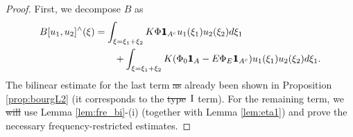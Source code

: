 \documentclass[a4paper,
11pt,  reqno]{amsart}
\newcommand{\mathbbm}[1]{\mathchoice%
    {\hbox{\sffamily 1\kern-.40em 1}}%
    {\hbox{\sffamily 1\kern-.40em 1}}%
    {\hbox{\scriptsize\sffamily 1\kern-.30em 1}}%
    {\hbox{\tiny\sffamily 1\kern-.25em 1}}}%
\newcommand{\I}{\hspace{0.2mm}\textup{I}\hspace{0.2mm}}
\newcommand{\5}{\textup{V}}
\theoremstyle{remark}
\numberwithin{equation}{section}
\numberwithin{theorem}{section}
\providecommand{\DIFaddtex}[1]{{\protect\color{blue}\uwave{#1}}} %
\providecommand{\DIFdeltex}[1]{{\protect\color{red}\sout{#1}}}                      %
\providecommand{\DIFaddbegin}{} %
\providecommand{\DIFaddend}{} %
\providecommand{\DIFdelbegin}{} %
\providecommand{\DIFdelend}{} %
\providecommand{\DIFadd}[1]{\texorpdfstring{\DIFaddtex{#1}}{#1}} %
\providecommand{\DIFdel}[1]{\texorpdfstring{\DIFdeltex{#1}}{}} %
\begin{document}
\begin{proof}
First, we decompose $B$ as
\DIFdelbegin %
\DIFdelend \DIFaddbegin \begin{align*}
B[u_1,u_2]^\wedge(\xi)&=\int_{\xi=\xi_1+\xi_2} K\Phi\mathbbm{1}_{A^c}u_1(\xi_1)u_2(\xi_2)d\xi_1 \\&\qquad+ \int_{\xi=\xi_1+\xi_2} K(\Phi_0\mathbbm{1}_A -E\Phi_E\mathbbm{1}_{A^c})u_1(\xi_1)u_2(\xi_2)d\xi_1.
\end{align*}\DIFaddend 
The bilinear estimate for the last term \DIFdelbegin \DIFdel{as }\DIFdelend \DIFaddbegin \DIFadd{has }\DIFaddend already been shown in Proposition \ref{prop:bourgL2} (it corresponds to the \DIFdelbegin \DIFdel{type }\DIFdelend \DIFaddbegin \DIFadd{Type }\DIFaddend $\I$ term). For the remaining term, we \DIFdelbegin \DIFdel{will }\DIFdelend use Lemma \ref{lem:fre_bi}-(i) (together with Lemma \ref{lem:eta1}) and prove the necessary frequency-restricted estimates.


\end{proof}
\end{document}
